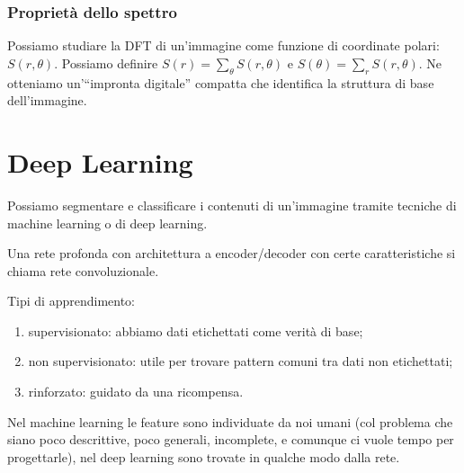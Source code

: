 \documentclass[a4paper,11pt]{article}
\begin{document}
\subsubsection{Proprietà dello spettro}
Possiamo studiare la DFT di un'immagine come funzione di coordinate polari: $S(r,\theta)$. Possiamo definire $S(r) = \sum_{\theta}S(r,\theta)$ e $S(\theta) = \sum_{r}S(r,\theta)$.
Ne otteniamo un'``impronta digitale'' compatta che identifica la struttura di base dell'immagine.

\newpage

\section{Deep Learning}
Possiamo segmentare e classificare i contenuti di un'immagine tramite tecniche di machine learning o di deep learning.
\par
Una rete profonda con architettura a encoder/decoder con certe caratteristiche si chiama rete convoluzionale.
\par
Tipi di apprendimento:
\begin{enumerate}
    \item supervisionato: abbiamo dati etichettati come verità di base;
    \item non supervisionato: utile per trovare pattern comuni tra dati non etichettati;
    \item rinforzato: guidato da una ricompensa.
\end{enumerate}
\par
Nel machine learning le feature sono individuate da noi umani (col problema che siano poco descrittive, poco generali, incomplete, e comunque ci vuole tempo per progettarle),
nel deep learning sono trovate in qualche modo dalla rete.
\end{document}
